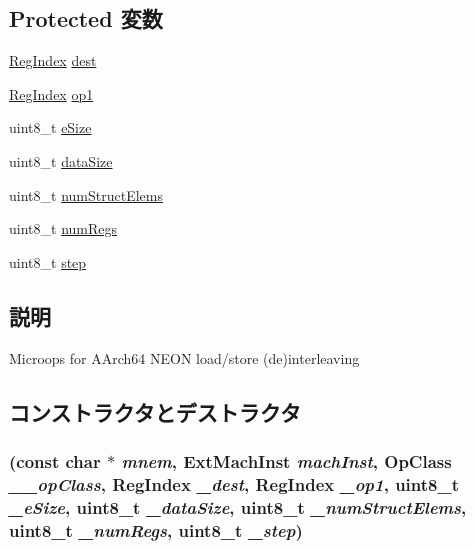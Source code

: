 \subsection*{Protected 変数}
\begin{DoxyCompactItemize}
\item 
\hyperlink{classStaticInst_a36d25e03e43fa3bb4c5482cbefe5e0fb}{RegIndex} \hyperlink{classArmISA_1_1MicroNeonMixOp64_a6563276134c2f303bab0c30e83e02220}{dest}
\item 
\hyperlink{classStaticInst_a36d25e03e43fa3bb4c5482cbefe5e0fb}{RegIndex} \hyperlink{classArmISA_1_1MicroNeonMixOp64_ae55982e6b9309683aef1b44249ab406f}{op1}
\item 
uint8\_\-t \hyperlink{classArmISA_1_1MicroNeonMixOp64_aac129ded07ba57383c5e2540f22c94ef}{eSize}
\item 
uint8\_\-t \hyperlink{classArmISA_1_1MicroNeonMixOp64_af13e629a2f79d14821c7b9246ef99e9f}{dataSize}
\item 
uint8\_\-t \hyperlink{classArmISA_1_1MicroNeonMixOp64_afb0be420b537599a5b86558127502040}{numStructElems}
\item 
uint8\_\-t \hyperlink{classArmISA_1_1MicroNeonMixOp64_a7a5268882c913c394a8ad4d988eb94e6}{numRegs}
\item 
uint8\_\-t \hyperlink{classArmISA_1_1MicroNeonMixOp64_a4a2eb71e89c989655301c2f2070e29b3}{step}
\end{DoxyCompactItemize}


\subsection{説明}
Microops for AArch64 NEON load/store (de)interleaving 

\subsection{コンストラクタとデストラクタ}
\hypertarget{classArmISA_1_1MicroNeonMixOp64_a7e806f9d0c1e32b27ec5d124d88f99be}{
\subsubsection[{MicroNeonMixOp64}]{ (const char $\ast$ {\em mnem}, \/  {\bf ExtMachInst} {\em machInst}, \/  OpClass {\em \_\-\_\-opClass}, \/  {\bf RegIndex} {\em \_\-dest}, \/  {\bf RegIndex} {\em \_\-op1}, \/  uint8\_\-t {\em \_\-eSize}, \/  uint8\_\-t {\em \_\-dataSize}, \/  uint8\_\-t {\em \_\-numStructElems}, \/  uint8\_\-t {\em \_\-numRegs}, \/  uint8\_\-t {\em \_\-step})}}
\label{classArmISA_1_1MicroNeonMixOp64_a7e806f9d0c1e32b27ec5d124d88f99be}



